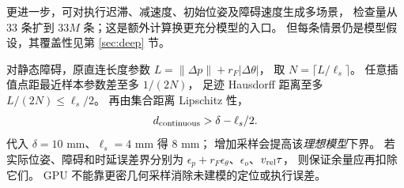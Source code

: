 更进一步，可对执行迟滞、减速度、初始位姿及障碍速度生成多场景，
检查量从 33 条扩到 $33M$ 条；这是额外计算换更充分模型的入口。
但每条情景仍是模型假设，其覆盖性见第 \ref{sec:deep} 节。

对静态障碍，原直连长度参数
$L=\|\Delta p\|+r_F|\Delta\theta|$，
取 $N=\lceil L/\ell_s\rceil$。
任意插值点距最近样本参数差至多 $1/(2N)$，
足迹 Hausdorff 距离至多 $L/(2N)\le\ell_s/2$。
再由集合距离 Lipschitz 性，
\begin{equation}
d_{\rm continuous}>\delta-\ell_s/2.
\end{equation}
代入 $\delta=10$ mm、$\ell_s=4$ mm 得 8 mm；
增加采样会提高该\emph{理想模型}下界。
若实际位姿、障碍和时延误差界分别为
$\epsilon_p+r_F\epsilon_\theta$、$\epsilon_o$、$v_{\rm rel}\tau$，
则保证余量应再扣除它们。
GPU 不能靠更密几何采样消除未建模的定位或执行误差。
